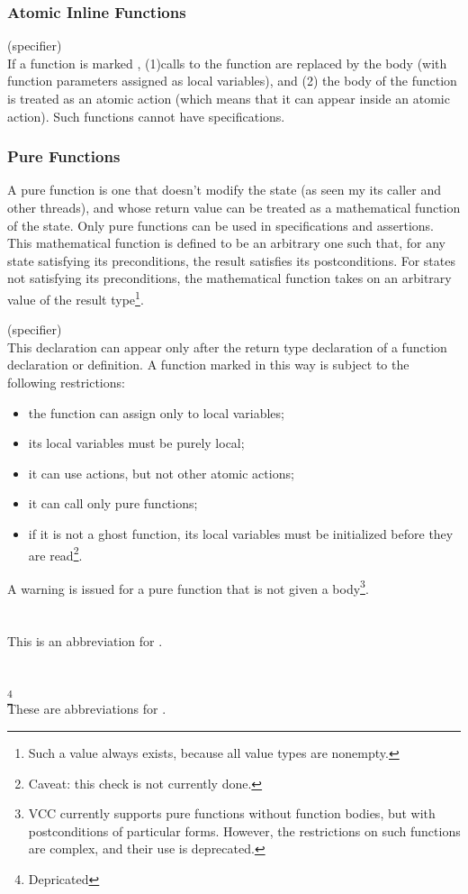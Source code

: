 \documentclass[preprint,nocopyrightspace]{sigplanconf}
\begin{document}
{{{\subsubsection{Atomic Inline Functions}

 (specifier)\\
If a function is marked , (1)calls to the
function are replaced by the body (with function parameters assigned
as local variables), and (2) the body of the function is treated as an
atomic action (which means that it can appear inside an atomic
action). Such functions cannot have specifications.

\subsubsection{Pure Functions}
A pure function is one that doesn't modify the state (as seen my its
caller and other threads), and whose return value can be treated as a
mathematical function of the state. Only pure functions can be used in
specifications and assertions. This mathematical function is defined
to be an arbitrary one such that, for any state satisfying its
preconditions, the result satisfies its postconditions. For states not
satisfying its preconditions, the mathematical function takes on an
arbitrary value of the result type\footnote{Such a value always exists,
because all value types are nonempty.}.

 (specifier)\\
This declaration can appear only after the return type declaration of
a function declaration or definition. A function marked in this way is
subject to the following restrictions:
\begin{itemize}
\item the function can assign only to local variables;
\item its local variables must be purely local;
\item it can use  actions, but not other atomic actions;
\item it can call only pure functions;
\item if it is not a ghost function, its local variables must be
initialized before they are read\footnote{Caveat: this check is not
currently done.}.
\end{itemize}

A warning is issued for a pure function that is not given a
body\footnote{
VCC currently supports pure functions without function
bodies, but with postconditions of particular forms. However, the
restrictions on such functions are complex, and their use is
deprecated.
}.
\\\\
\\
This is an abbreviation for 
.
\\\\
\\
\footnote{Depricated}\\
These are abbreviations for . 

}}}
\end{document}
